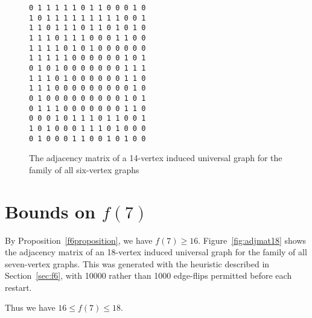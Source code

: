 \documentclass[12pt]{article}
\begin{document}
\begin{figure}[htb]
\centering
\small
\verb|0 1 1 1 1 1 0 1 1 0 0 0 1 0| \\
\verb|1 0 1 1 1 1 1 1 1 1 1 0 0 1| \\
\verb|1 1 0 1 1 1 0 1 1 0 1 0 1 0| \\
\verb|1 1 1 0 1 1 1 0 0 0 1 1 0 0| \\
\verb|1 1 1 1 0 1 0 1 0 0 0 0 0 0| \\
\verb|1 1 1 1 1 0 0 0 0 0 0 1 0 1| \\
\verb|0 1 0 1 0 0 0 0 0 0 0 1 1 1| \\
\verb|1 1 1 0 1 0 0 0 0 0 0 1 1 0| \\
\verb|1 1 1 0 0 0 0 0 0 0 0 0 1 0| \\
\verb|0 1 0 0 0 0 0 0 0 0 0 1 0 1| \\
\verb|0 1 1 1 0 0 0 0 0 0 0 1 1 0| \\
\verb|0 0 0 1 0 1 1 1 0 1 1 0 0 1| \\
\verb|1 0 1 0 0 0 1 1 1 0 1 0 0 0| \\
\verb|0 1 0 0 0 1 1 0 0 1 0 1 0 0|
\caption{The adjacency matrix of a 14-vertex induced universal graph for the family of all
six-vertex graphs}
\label{fig:adjmat14}
\end{figure}

\section{Bounds on \texorpdfstring{$f(7)$}{f(7)}}\label{sec:f7}

By Proposition~\ref{f6proposition}, we have $f(7) \geq 16$.  Figure~\ref{fig:adjmat18}
shows the adjacency matrix of an 18-vertex induced universal
graph for the family of all seven-vertex graphs. This was generated with 
the heuristic described in Section~\ref{sec:f6}, with 10000 rather than 1000
edge-flips permitted before each restart.

Thus we have $16 \leq f(7) \leq 18$.
\end{document}
